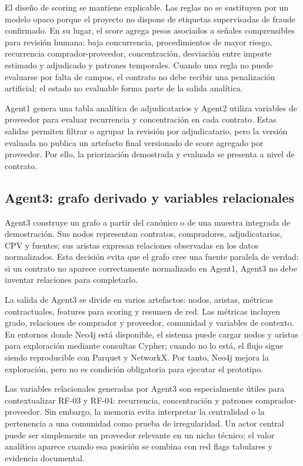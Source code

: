 \documentclass[11pt,a4paper,spanish]{book}
\numberwithin{equation}{chapter}
\numberwithin{figure}{chapter}
\begin{document}
El dise{\~n}o de scoring se mantiene explicable. Las reglas no se sustituyen por un modelo opaco
porque el proyecto no dispone de etiquetas supervisadas de fraude confirmado. En su lugar, el score
agrega pesos asociados a se{\~n}ales comprensibles para revisi{\'o}n humana: baja concurrencia,
procedimientos de mayor riesgo, recurrencia comprador-proveedor, concentraci{\'o}n, desviaci{\'o}n
entre importe estimado y adjudicado y patrones temporales. Cuando una regla no puede evaluarse por
falta de campos, el contrato no debe recibir una penalizaci{\'o}n artificial; el estado no evaluable
forma parte de la salida anal{\'i}tica.

Agent1 genera una tabla anal{\'i}tica de adjudicatarios y Agent2 utiliza variables de proveedor para
evaluar recurrencia y concentraci{\'o}n en cada contrato. Estas salidas permiten filtrar o agrupar la
revisi{\'o}n por adjudicatario, pero la versi{\'o}n evaluada no publica un artefacto final versionado de
score agregado por proveedor. Por ello, la priorizaci{\'o}n demostrada y evaluada se presenta a nivel
de contrato.

\subsection{Agent3: grafo derivado y variables relacionales}

Agent3 construye un grafo a partir del can{\'o}nico o de una muestra integrada de demostraci{\'o}n. Sus
nodos representan contratos, compradores, adjudicatarios, CPV y fuentes; sus aristas expresan
relaciones observadas en los datos normalizados. Esta decisi{\'o}n evita que el grafo cree una fuente
paralela de verdad: si un contrato no aparece correctamente normalizado en Agent1, Agent3 no debe
inventar relaciones para completarlo.

La salida de Agent3 se divide en varios artefactos: nodos, aristas, m{\'e}tricas contractuales,
features para scoring y resumen de red. Las m{\'e}tricas incluyen grado, relaciones de comprador y
proveedor, comunidad y variables de contexto. En entornos donde Neo4j est{\'a} disponible, el sistema
puede cargar nodos y aristas para exploraci{\'o}n mediante consultas Cypher; cuando no lo est{\'a}, el
flujo sigue siendo reproducible con Parquet y NetworkX. Por tanto, Neo4j mejora la exploraci{\'o}n,
pero no es condici{\'o}n obligatoria para ejecutar el prototipo.

Las variables relacionales generadas por Agent3 son especialmente {\'u}tiles para contextualizar RF-03
y RF-04: recurrencia, concentraci{\'o}n y patrones comprador-proveedor. Sin embargo, la memoria evita
interpretar la centralidad o la pertenencia a una comunidad como prueba de irregularidad. Un actor
central puede ser simplemente un proveedor relevante en un nicho t{\'e}cnico; el valor anal{\'i}tico
aparece cuando esa posici{\'o}n se combina con red flags tabulares y evidencia documental.
\end{document}
